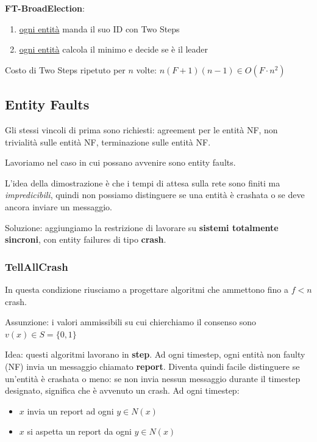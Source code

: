 \textbf{FT-BroadElection}:
\begin{enumerate}
  \item \underline{ogni entità} manda il suo ID con Two Steps
  \item \underline{ogni entità} calcola il minimo e decide se è il leader
\end{enumerate}

Costo di Two Steps ripetuto per $n$ volte: $n (F+1) (n-1) \in O(F \cdot n^2)$

\subsection{Entity Faults}
Gli stessi vincoli di prima sono richiesti: agreement per le entità NF, non trivialità sulle entità NF, terminazione
sulle entità NF.

Lavoriamo nel caso in cui possano avvenire sono entity faults.


L'idea della dimostrazione è che i tempi di attesa sulla rete sono finiti ma \textit{impredicibili}, quindi non possiamo distinguere
se una entità è crashata o se deve ancora inviare un messaggio.

Soluzione: aggiungiamo la restrizione di lavorare su \textbf{sistemi totalmente sincroni}, con entity failures di tipo \textbf{crash}.

\subsubsection{TellAllCrash}
In questa condizione riusciamo a progettare algoritmi che ammettono fino a $f < n$ crash.

Assunzione: i valori ammissibili su cui chierchiamo il consenso sono $v(x) \in S = \{0, 1\}$

Idea: questi algoritmi lavorano in \textbf{step}. Ad ogni timestep, ogni entità non faulty (NF) invia un messaggio chiamato
\textbf{report}. Diventa quindi facile distinguere se un'entità è crashata o meno: se non invia nessun messaggio
durante il timestep designato, significa che è avvenuto un crash. Ad ogni timestep:
\begin{itemize}
  \item $x$ invia un report ad ogni $y \in N(x)$
  \item $x$ si aspetta un report da ogni $y \in N(x)$
\end{itemize}

